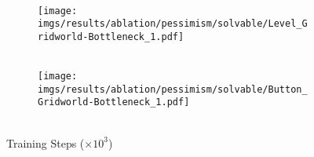 \begin{figure}[bth]
\begin{subfigure}[b]{0.16\textwidth}
        \\
        \texttt{[image: imgs/results/ablation/pessimism/solvable/Level\_Gridworld-Bottleneck\_1.pdf]}
    \end{subfigure} 
    \hfill
    \begin{subfigure}[b]{0.16\textwidth}
        \centering
        \\[-1.5pt]
        \texttt{[image: imgs/results/ablation/pessimism/solvable/Button\_Gridworld-Bottleneck\_1.pdf]}
    \end{subfigure}
    \\[-1.5pt]
    {\scriptsize{Training Steps ($\times 10^3$)}}
    \label{fig:result_new_env}
    \vspace{-15pt}
\end{figure}
%
%
%
